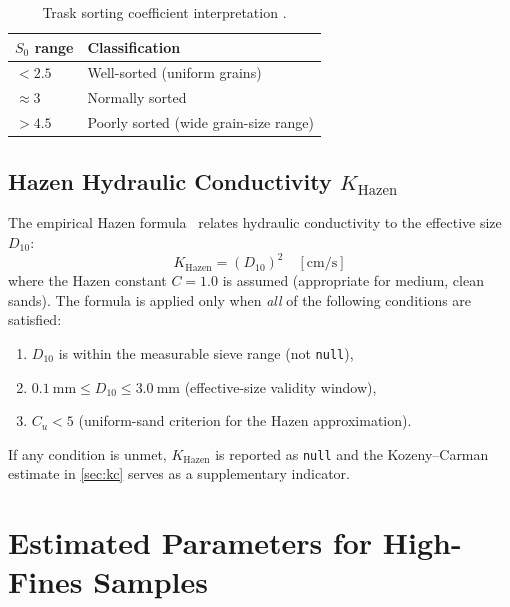 \documentclass[12pt,a4paper]{article}
\begin{document}
\begin{table}[H]
    \centering
    \caption{Trask sorting coefficient interpretation \citep{trask1932}.}
    \label{tab:s0}
    \begin{tabular}{ll}
        \toprule
        $S_0$ range & Classification \\
        \midrule
        $< 2.5$     & Well-sorted (uniform grains) \\
        $\approx 3$ & Normally sorted \\
        $> 4.5$     & Poorly sorted (wide grain-size range) \\
        \bottomrule
    \end{tabular}
\end{table}

\subsection{Hazen Hydraulic Conductivity \texorpdfstring{$K_{\mathrm{Hazen}}$}{K\_Hazen}}
\label{sec:hazen}

The empirical Hazen formula~\citep{hazen1911} relates hydraulic conductivity
to the effective size $D_{10}$:
\begin{equation}
    K_{\mathrm{Hazen}} = (D_{10})^2 \quad [\si{\centi\metre\per\second}]
    \label{eq:hazen}
\end{equation}
where the Hazen constant $C = 1.0$ is assumed (appropriate for medium, clean
sands).  The formula is applied only when \emph{all} of the following
conditions are satisfied:
\begin{enumerate}
    \item $D_{10}$ is within the measurable sieve range (not \texttt{null}),
    \item $\SI{0.1}{\milli\metre} \le D_{10} \le \SI{3.0}{\milli\metre}$
          (effective-size validity window),
    \item $C_u < 5$ (uniform-sand criterion for the Hazen approximation).
\end{enumerate}
If any condition is unmet, $K_{\mathrm{Hazen}}$ is reported as \texttt{null}
and the Kozeny--Carman estimate in \cref{sec:kc} serves as a supplementary
indicator.

\section{Estimated Parameters for High-Fines Samples}
\label{sec:estimated}
\end{document}
